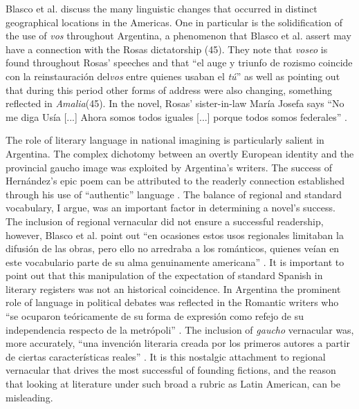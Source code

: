 Blasco et al. discuss the many linguistic changes that occurred in distinct geographical locations in the Americas.
One in particular is the solidification of the use of \textit{vos} throughout Argentina, a phenomenon that Blasco et al. assert may have a connection with the Rosas dictatorship (45).
They note that \textit{voseo} is found throughout Rosas' speeches and that \enquote{el auge y triunfo de rozismo coincide con la reinstauración del\textit{vos} entre quienes usaban el \textit{tú}} as well as pointing out that during this period other forms of address were also changing, something reflected in \textit{Amalia}(45).
In the novel, Rosas' sister-in-law María Josefa says \enquote{No me diga Usía [...] Ahora somos todos iguales [...] porque todos somos federales} \autocite[Mármol in][45]{Blasco1991}.

The role of literary language in national imagining is particularly salient in Argentina.
The complex dichotomy between an overtly European identity and the provincial gaucho image was exploited by Argentina's writers.
The success of Hernández's epic poem can be attributed to the readerly connection established through his use of \enquote{authentic} language \autocite[110]{Sommer1991}.
The balance of regional and standard vocabulary, I argue, was an important factor in determining a novel's success. 
The inclusion of regional vernacular did not ensure a successful readership, however, Blasco et al. point out \enquote{en ocasiones estos usos regionales limitaban la difusión de las obras, pero ello no arredraba a los románticos, quienes veían en este vocabulario parte de su alma genuinamente americana} \autocite[47]{Blasco1991}.
It is important to point out that this manipulation of the expectation of standard Spanish in literary registers was not an historical coincidence.
In Argentina the prominent role of language in political debates was reflected in the Romantic writers who \enquote{se ocuparon teóricamente de su forma de expresión como refejo de su independencia respecto de la metrópoli} \autocite[51]{Blasco1991}.
The inclusion of \textit{gaucho} vernacular was, more accurately, \enquote{una invención literaria creada por los primeros autores a partir de ciertas características reales} \autocite[48]{Blasco1991}.
It is this nostalgic attachment to regional vernacular that drives the most successful of founding fictions, and the reason that looking at literature under such broad a rubric as Latin American, can be misleading.